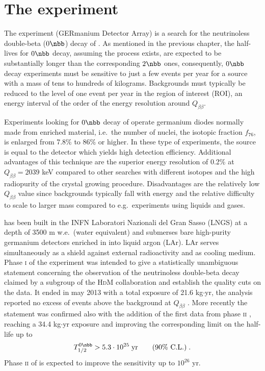 \chapter{The {\gerda} experiment}
The {\gerda} experiment (GERmanium Detector Array) is a search for the neutrinoless double-beta ($0\nbb$) decay of . As mentioned in the previous chapter, the half-lives for $0\nbb$ decay, assuming the process exists, are expected to be substantially longer than the corresponding $2\nbb$ ones, consequently, $0\nbb$ decay experiments must be sensitive to just a few events per year for a source with a mass of tens to hundreds of kilograms. Backgrounds must typically be reduced to the level of one event per year in the region of interest (ROI), an energy interval of the order of the energy resolution around $Q_{\beta\beta}$. 

Experiments looking for $0\nbb$ decay of  operate germanium diodes normally made from enriched material, i.e.~the number of  nuclei, the isotopic fraction $f_{76}$, is enlarged from 7.8\% to 86\% or higher. In these type of experiments, the source is equal to the detector which yields high detection efficiency. Additional advantages of this technique are the superior energy resolution of 0.2\% at $Q_{\beta\beta}=2039$ keV compared to other searches with different isotopes and the high radiopurity of the crystal growing procedure. Disadvantages are the relatively low $Q_{\beta\beta}$ value since backgrounds typically fall with energy and the relative difficulty to scale to larger mass compared to e.g.~experiments using liquids and gases.

{\gerda} has been built in the INFN Laboratori Nazionali del Gran Sasso (LNGS) at a depth of 3500 m w.e.~(water equivalent) and submerses bare high-purity germanium detectors enriched in  into liquid argon (LAr). LAr serves simultaneously as a shield against external radioactivity and as cooling medium. Phase \textsc{i} of the experiment was intended to give a statistically unambiguous statement concerning the observation of the neutrinoless double-beta decay claimed by a subgroup of the \textsc{HdM} collaboration \cite{hdmclaim} and establish the quality cuts on the data. It ended in may 2013 with a total exposure of 21.6 kg$\cdot$yr, the analysis reported no excess of events above the background at $Q_{\beta\beta}$ \cite{resultsphase1}. More recently the statement was confirmed also with the addition of the first data from phase \textsc{ii} \cite{nature}, reaching a 34.4 kg$\cdot$yr exposure and improving the corresponding limit on the half-life up to
\[T_{1/2}^{0\nbb}>5.3\cdot10^{25}\;\text{yr}\qquad\text{(90\% C.L.)}\;.\]
Phase \textsc{ii} of {\gerda} is expected to improve the sensitivity up to $10^{26}$ yr.

